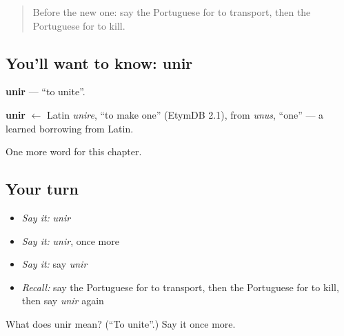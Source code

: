 \label{lesson:PT-C144-unir}



\begin{quote}
Before the new one: say the Portuguese for to transport, then the Portuguese for to kill.
\end{quote}

\subsection*{You'll want to know: unir}
\textbf{unir} — \textquotedblleft{}to unite\textquotedblright{}.

\begin{cousinweb}
\textbf{unir} $\leftarrow$ Latin \emph{unire}, \textquotedblleft{}to make one\textquotedblright{} (EtymDB 2.1), from \emph{unus}, \textquotedblleft{}one\textquotedblright{} — a learned borrowing from Latin.
\end{cousinweb}

\begin{grammarlens}[title={What you've built}]
One more word for this chapter.
\end{grammarlens}

\subsection*{Your turn}
\begin{itemize}
\raggedright
  \item \emph{Say it:} \emph{unir}
  \item \emph{Say it:} \emph{unir}, once more
  \item \emph{Say it:} say \emph{unir}
  \item \emph{Recall:} say the Portuguese for to transport, then the Portuguese for to kill, then say \emph{unir} again
\end{itemize}

\begin{tcolorbox}[breakable,colback=teal!4,colframe=teal!35!black,title={Before you move on}]
What does unir mean? (\textquotedblleft{}To unite\textquotedblright{}.) Say it once more.
\end{tcolorbox}
